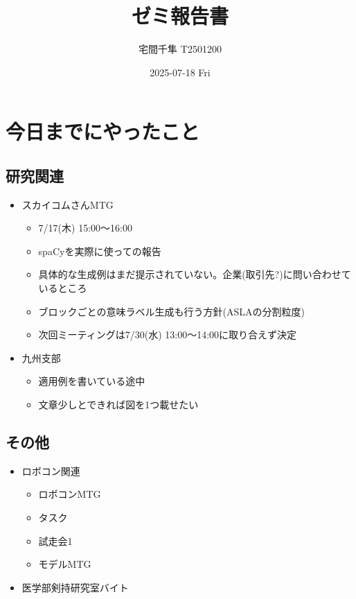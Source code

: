 \documentclass[uplatex, onecolumn, 10pt]{jsarticle}
\begin{document}
\title{\vspace{-40mm}\bf{\LARGE{ゼミ報告書}}}
\author{\vspace{-40mm}宅間千隼 T2501200}
\date{2025-07-18 Fri}
\maketitle


\section{今日までにやったこと}

\subsection*{研究関連} 
\begin{itemize}
	\item スカイコムさんMTG
	\begin{itemize}
		\item 7/17(木) 15:00～16:00
		\item spaCyを実際に使っての報告
		\item 具体的な生成例はまだ提示されていない。企業(取引先?)に問い合わせているところ
		\item ブロックごとの意味ラベル生成も行う方針(ASLAの分割粒度)
		\item 次回ミーティングは7/30(水) 13:00～14:00に取り合えず決定
	\end{itemize}
	\item 九州支部
	\begin{itemize}
		\item 適用例を書いている途中
		\item 文章少しとできれば図を1つ載せたい
	\end{itemize}
\end{itemize}

\subsection*{その他}
\begin{itemize}
	\item ロボコン関連
	\begin{itemize}
		\item ロボコンMTG
		\item タスク
		\item 試走会1
		\item モデルMTG
	\end{itemize}
	\item 医学部剣持研究室バイト
\end{itemize}
\end{document}
